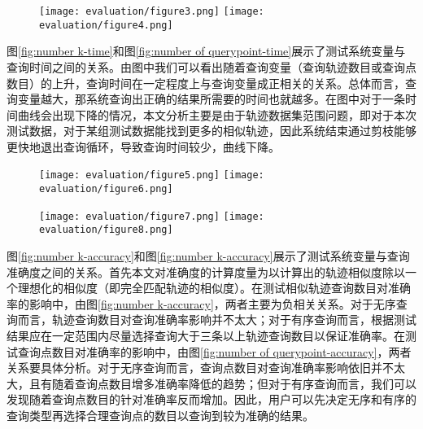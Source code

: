 \begin{figure}[!htp]
  \centering
  \texttt{[image: evaluation/figure3.png]}
  \hspace{0.5cm}
  \texttt{[image: evaluation/figure4.png]}
\end{figure}

图\ref{fig:number k-time}和图\ref{fig:number of querypoint-time}展示了测试系统变量与查询时间之间的关系。由图中我们可以看出随着查询变量（查询轨迹数目或查询点数目）的上升，查询时间在一定程度上与查询变量成正相关的关系。总体而言，查询变量越大，那系统查询出正确的结果所需要的时间也就越多。在图中对于一条时间曲线会出现下降的情况，本文分析主要是由于轨迹数据集范围问题，即对于本次测试数据，对于某组测试数据能找到更多的相似轨迹，因此系统结束通过剪枝能够更快地退出查询循环，导致查询时间较少，曲线下降。

\begin{figure}[!htp]
  \centering
  \texttt{[image: evaluation/figure5.png]}
  \hspace{0.5cm}
  \texttt{[image: evaluation/figure6.png]}
\end{figure}

\begin{figure}[h]
  \centering
  \texttt{[image: evaluation/figure7.png]}
  \hspace{0.5cm}
  \texttt{[image: evaluation/figure8.png]}
\end{figure}

图\ref{fig:number k-accuracy}和图\ref{fig:number k-accuracy}展示了测试系统变量与查询准确度之间的关系。首先本文对准确度的计算度量为以计算出的轨迹相似度除以一个理想化的相似度（即完全匹配轨迹的相似度）。在测试相似轨迹查询数目对准确率的影响中，由图\ref{fig:number k-accuracy}，两者主要为负相关关系。对于无序查询而言，轨迹查询数目对查询准确率影响并不太大；对于有序查询而言，根据测试结果应在一定范围内尽量选择查询大于三条以上轨迹查询数目以保证准确率。在测试查询点数目对准确率的影响中，由图\ref{fig:number of querypoint-accuracy}，两者关系要具体分析。对于无序查询而言，查询点数目对查询准确率影响依旧并不太大，且有随着查询点数目增多准确率降低的趋势；但对于有序查询而言，我们可以发现随着查询点数目的针对准确率反而增加。因此，用户可以先决定无序和有序的查询类型再选择合理查询点的数目以查询到较为准确的结果。

